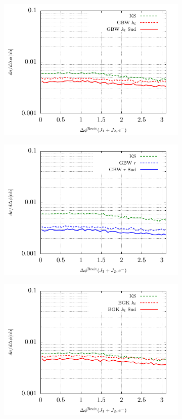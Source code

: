 \documentclass[a4,12pt]{article}
\begin{document}
\begin{figure}[p]
\begin{subfigure}{0.5\textwidth}
	\includegraphics[width=\textwidth]{gnuplot/plotGBW2}
	\end{subfigure}
	\begin{subfigure}{0.5\textwidth}
	\includegraphics[width=\textwidth]{gnuplot/plotGBW3}
	\end{subfigure}
	\begin{subfigure}{0.5\textwidth}
	\includegraphics[width=\textwidth]{gnuplot/plotBGK2}

\end{subfigure}
\end{figure}
\end{document}
